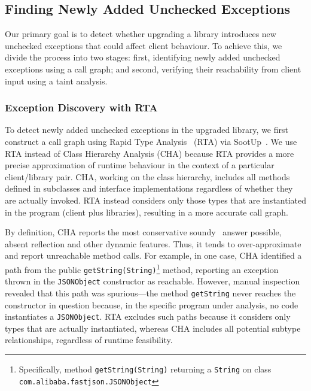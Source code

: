 \subsection{Finding Newly Added Unchecked Exceptions}

Our primary goal is to detect whether upgrading a library introduces new unchecked exceptions that could affect client behaviour. To achieve this, we divide the process into two stages: first, identifying newly added unchecked exceptions using a call graph; and second, verifying their reachability from client input using a taint analysis.

\subsubsection{Exception Discovery with RTA}

To detect newly added unchecked exceptions in the upgraded library, we first construct a call graph using Rapid Type Analysis~\cite{bacon96:_fast_static_analy_c_virtual_funct_calls} (RTA) via SootUp~\cite{Karakaya24:_sootup}. We use RTA instead of Class Hierarchy Analysis (CHA) because RTA provides a more precise approximation of runtime behaviour in the context of a particular client/library pair. CHA, working on the class hierarchy, includes all methods defined in subclasses and interface implementations regardless of whether they are actually invoked. RTA instead considers only those types that are instantiated in the program (client plus libraries), resulting in a more accurate call graph.

By definition, CHA reports the most conservative soundy~\cite{livshits15:_in} answer possible, absent reflection and other dynamic features. Thus, it tends to over-approximate and report unreachable method calls. For example, in one case, CHA identified a path from the public \texttt{getString(String)}\footnote{Specifically, method \texttt{getString(String)} returning a \texttt{String} on class \texttt{com.alibaba.fastjson.JSONObject}} method, reporting an exception thrown in the \texttt{JSONObject} constructor as reachable. However, manual inspection revealed that this path was spurious—the method \texttt{getString} never reaches the constructor in question because, in the specific program under analysis, no code instantiates a \texttt{JSONObject}. RTA excludes such paths because it considers only types that are actually instantiated, whereas CHA includes all potential subtype relationships, regardless of runtime feasibility.

